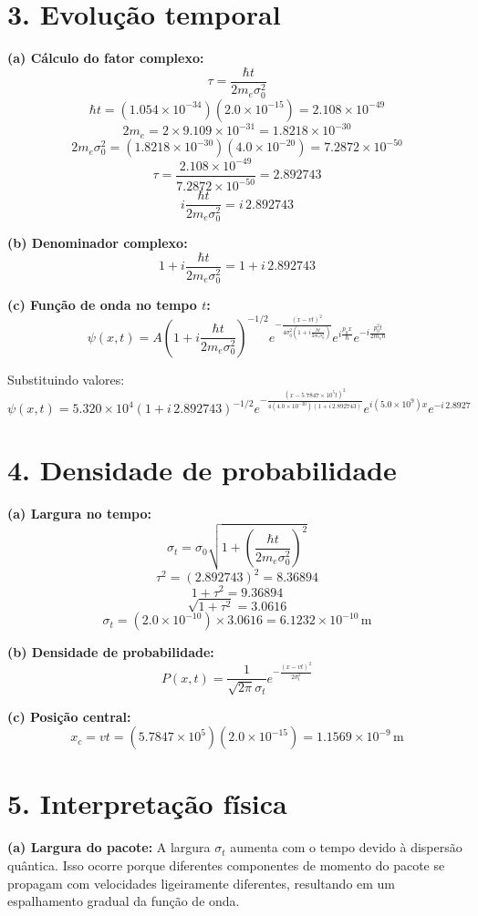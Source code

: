 \documentclass[a4paper,12pt]{article}
\begin{document}
\section*{3. Evolução temporal}

\textbf{(a) Cálculo do fator complexo:}
\[
\tau = \frac{\hbar t}{2 m_e \sigma_0^2}
\]
\[
\hbar t = (1.054\times10^{-34})(2.0\times10^{-15}) = 2.108\times10^{-49}
\]
\[
2 m_e = 2 \times 9.109\times10^{-31} = 1.8218\times10^{-30}
\]
\[
2 m_e \sigma_0^2 = (1.8218\times10^{-30})(4.0\times10^{-20}) = 7.2872\times10^{-50}
\]
\[
\tau = \frac{2.108\times10^{-49}}{7.2872\times10^{-50}} = 2.892743
\]
\[
i\frac{\hbar t}{2m_e\sigma_0^2} = i\,2.892743
\]

\textbf{(b) Denominador complexo:}
\[
1 + i\frac{\hbar t}{2m_e\sigma_0^2} = 1 + i\,2.892743
\]

\textbf{(c) Função de onda no tempo $t$:}
\[
\psi(x,t) = A \left(1 + i\frac{\hbar t}{2m_e\sigma_0^2}\right)^{-1/2}
e^{-\frac{(x - vt)^2}{4\sigma_0^2(1 + i\frac{\hbar t}{2m_e\sigma_0^2})}}
e^{i\frac{p_0x}{\hbar}} e^{-i\frac{p_0^2t}{2m_e\hbar}}
\]

Substituindo valores:
\[
\psi(x,t) = 5.320\times10^4 (1 + i\,2.892743)^{-1/2}
e^{-\frac{(x - 5.7847\times10^5 t)^2}{4(4.0\times10^{-20})(1 + i\,2.892743)}}
e^{i(5.0\times10^9)x} e^{-i\,2.8927}
\]

\section*{4. Densidade de probabilidade}

\textbf{(a) Largura no tempo:}
\[
\sigma_t = \sigma_0 \sqrt{1 + \left(\frac{\hbar t}{2m_e\sigma_0^2}\right)^2}
\]
\[
\tau^2 = (2.892743)^2 = 8.36894
\]
\[
1 + \tau^2 = 9.36894
\]
\[
\sqrt{1 + \tau^2} = 3.0616
\]
\[
\sigma_t = (2.0\times10^{-10}) \times 3.0616 = 6.1232\times10^{-10}\,\text{m}
\]

\textbf{(b) Densidade de probabilidade:}
\[
P(x,t) = \frac{1}{\sqrt{2\pi}\sigma_t} e^{-\frac{(x - vt)^2}{2\sigma_t^2}}
\]

\textbf{(c) Posição central:}
\[
x_c = vt = (5.7847\times10^5)(2.0\times10^{-15}) = 1.1569\times10^{-9}\,\text{m}
\]

\section*{5. Interpretação física}

\textbf{(a) Largura do pacote:}  
A largura $\sigma_t$ aumenta com o tempo devido à dispersão quântica. Isso ocorre porque diferentes componentes de momento do pacote se propagam com velocidades ligeiramente diferentes, resultando em um espalhamento gradual da função de onda.
\end{document}
